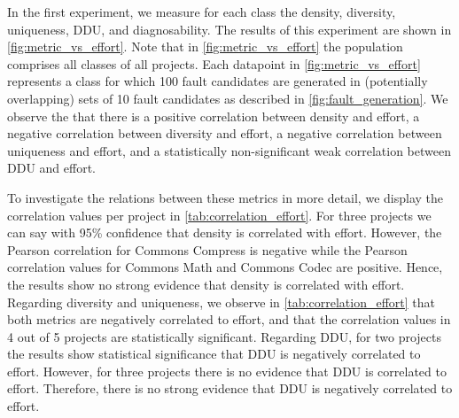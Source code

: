 \documentclass[twoside,a4paper,11pt]{memoir}
\begin{document}
In the first experiment, we measure for each class the density, diversity, uniqueness, DDU, and diagnosability.
The results of this experiment are shown in \autoref{fig:metric_vs_effort}.
Note that in \autoref{fig:metric_vs_effort} the population comprises all classes of all projects.
Each datapoint in \autoref{fig:metric_vs_effort} represents a class for which 100 fault candidates are generated in (potentially overlapping) sets of 10 fault candidates as described in \autoref{fig:fault_generation}.
We observe the that there is a positive correlation between density and effort, a negative correlation between diversity and effort, a negative correlation between uniqueness and effort, and a statistically non-significant weak correlation between DDU and effort.

To investigate the relations between these metrics in more detail, we display the correlation values per project in \autoref{tab:correlation_effort}.
For three projects we can say with 95\% confidence that density is correlated with effort.
However, the Pearson correlation for Commons Compress is negative while the Pearson correlation values for Commons Math and Commons Codec are positive.
Hence, the results show no strong evidence that density is correlated with effort.
Regarding diversity and uniqueness, we observe in \autoref{tab:correlation_effort} that both metrics are negatively correlated to effort, and that the correlation values in 4 out of 5 projects are statistically significant.
Regarding DDU, for two projects the results show statistical significance that DDU is negatively correlated to effort.
However, for three projects there is no evidence that DDU is correlated to effort.
Therefore, there is no strong evidence that DDU is negatively correlated to effort.
\end{document}
